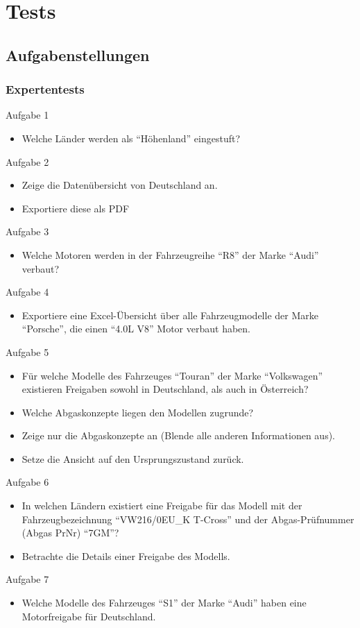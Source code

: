 \chapter{Tests}
\section{Aufgabenstellungen}
\subsection{Expertentests} \label{sec:tasksExpert}
Aufgabe 1
\begin{itemize}
	\item Welche Länder werden als \enquote{Höhenland} eingestuft?
\end{itemize}
Aufgabe 2
\begin{itemize}
	\item Zeige die Datenübersicht von Deutschland an.
	\item Exportiere diese als PDF
\end{itemize}
Aufgabe 3
\begin{itemize}
	\item Welche Motoren werden in der Fahrzeugreihe \enquote{R8} der Marke \enquote{Audi} verbaut?
\end{itemize}
Aufgabe 4
\begin{itemize}
	\item Exportiere eine Excel-Übersicht über alle Fahrzeugmodelle der Marke \enquote{Porsche}, die einen \enquote{4.0L V8} Motor verbaut haben.
\end{itemize}
Aufgabe 5
\begin{itemize}
	\item Für welche Modelle des Fahrzeuges \enquote{Touran} der Marke \enquote{Volkswagen} existieren Freigaben sowohl in Deutschland, als auch in Österreich?
	\item Welche Abgaskonzepte liegen den Modellen zugrunde?
	\item Zeige nur die Abgaskonzepte an (Blende alle anderen Informationen aus).
	\item Setze die Ansicht auf den Ursprungszustand zurück.
\end{itemize}
Aufgabe 6
\begin{itemize}
	\item In welchen Ländern existiert eine Freigabe für das Modell mit der Fahrzeugbezeichnung \enquote{VW216/0EU\_{}K T-Cross} und der Abgas-Prüfnummer (Abgas PrNr) \enquote{7GM}?
	\item Betrachte die Details einer Freigabe des Modells.
\end{itemize}
Aufgabe 7
\begin{itemize}
	\item Welche Modelle des Fahrzeuges \enquote{S1} der Marke \enquote{Audi} haben eine Motorfreigabe für Deutschland.
\end{itemize}

